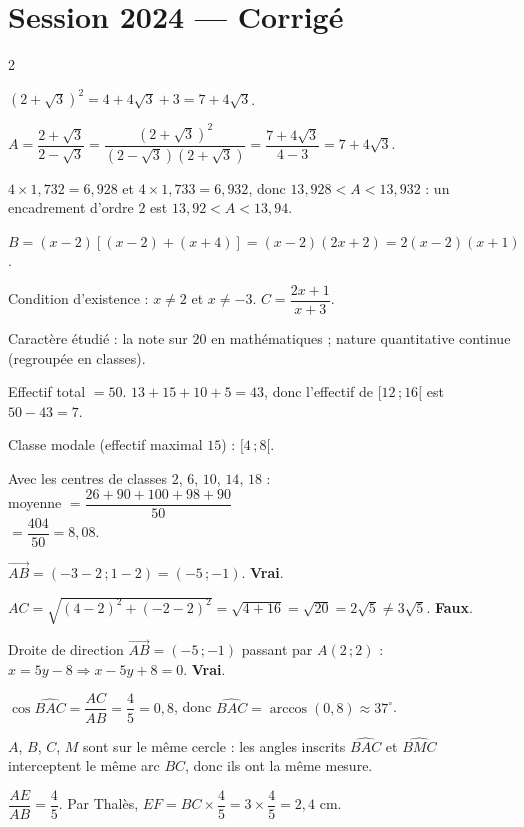 \section{Session 2024 — Corrigé}
\begin{multicols}{2}

$(2+\sqrt3)^{2}=4+4\sqrt3+3=7+4\sqrt3$.

$A=\dfrac{2+\sqrt3}{2-\sqrt3}=\dfrac{(2+\sqrt3)^{2}}{(2-\sqrt3)(2+\sqrt3)}=\dfrac{7+4\sqrt3}{4-3}=7+4\sqrt3$.

$4\times1{,}732=6{,}928$ et $4\times1{,}733=6{,}932$, donc $13{,}928<A<13{,}932$ : un
encadrement d'ordre $2$ est $13{,}92<A<13{,}94$.

$B=(x-2)[(x-2)+(x+4)]=(x-2)(2x+2)=2(x-2)(x+1)$.

Condition d'existence : $x\ne2$ et $x\ne-3$. $C=\dfrac{2x+1}{x+3}$.

Caractère étudié : la note sur $20$ en mathématiques ; nature quantitative continue
(regroupée en classes).

Effectif total $=50$. $13+15+10+5=43$, donc l'effectif de $[12\,;16[$ est $50-43=7$.

Classe modale (effectif maximal $15$) : $[4\,;8[$.

Avec les centres de classes $2$, $6$, $10$, $14$, $18$ :\\
moyenne $=\dfrac{26+90+100+98+90}{50}$\\
$=\dfrac{404}{50}=8{,}08$.

$\overrightarrow{AB}=(-3-2\,;1-2)=(-5\,;-1)$. \textbf{Vrai}.

$AC=\sqrt{(4-2)^{2}+(-2-2)^{2}}=\sqrt{4+16}=\sqrt{20}=2\sqrt5\ne3\sqrt5$. \textbf{Faux}.

Droite de direction $\overrightarrow{AB}=(-5\,;-1)$ passant par $A(2\,;2)$ :
$x=5y-8\Rightarrow x-5y+8=0$. \textbf{Vrai}.

$\cos\widehat{BAC}=\dfrac{AC}{AB}=\dfrac45=0{,}8$, donc
$\widehat{BAC}=\arccos(0{,}8)\approx37^{\circ}$.

$A$, $B$, $C$, $M$ sont sur le même cercle : les angles inscrits $\widehat{BAC}$ et
$\widehat{BMC}$ interceptent le même arc $BC$, donc ils ont la même mesure.

$\dfrac{AE}{AB}=\dfrac45$. Par Thalès, $EF=BC\times\dfrac45=3\times\dfrac45=2{,}4$ cm.


\end{multicols}
